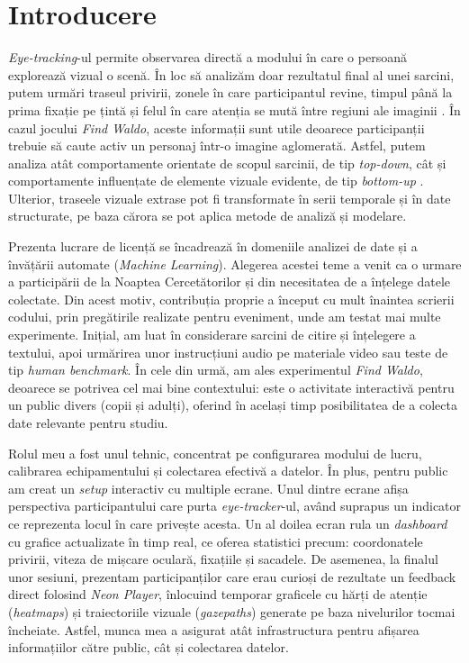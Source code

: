 \section{Introducere}

\emph{Eye-tracking}-ul permite observarea directă a modului în care o persoană explorează vizual o scenă. În loc să analizăm doar rezultatul final al unei sarcini, putem urmări traseul privirii, zonele în care participantul revine, timpul până la prima fixație pe țintă și felul în care atenția se mută între regiuni ale imaginii \cite{yarbus1967,just1980}. În cazul jocului \emph{Find Waldo}, aceste informații sunt utile deoarece participanții trebuie să caute activ un personaj într-o imagine aglomerată. Astfel, putem analiza atât comportamente orientate de scopul sarcinii, de tip \emph{top-down}, cât și comportamente influențate de elemente vizuale evidente, de tip \emph{bottom-up} \cite{itti1998,otero2016waldo,wolfe2020visual}. Ulterior, traseele vizuale extrase pot fi transformate în serii temporale și în date structurate, pe baza cărora se pot aplica metode de analiză și modelare.

Prezenta lucrare de licență se încadrează în domeniile analizei de date și a învățării automate (\emph{Machine Learning}). Alegerea acestei teme a venit ca o urmare a participării de la Noaptea Cercetătorilor și din necesitatea de a înțelege datele colectate. Din acest motiv, contribuția proprie a început cu mult înaintea scrierii codului, prin pregătirile realizate pentru eveniment, unde am testat mai multe experimente. Inițial, am luat în considerare sarcini de citire și înțelegere a textului, apoi urmărirea unor instrucțiuni audio pe materiale video sau teste de tip \emph{human benchmark}. În cele din urmă, am ales experimentul \emph{Find Waldo}, deoarece se potrivea cel mai bine contextului: este o activitate interactivă pentru un public divers (copii și adulți), oferind în același timp posibilitatea de a colecta date relevante pentru studiu. 

Rolul meu a fost unul tehnic, concentrat pe configurarea modului de lucru, calibrarea echipamentului și colectarea efectivă a datelor. În plus, pentru public am creat un \emph{setup} interactiv cu multiple ecrane. Unul dintre ecrane afișa perspectiva participantului care purta \emph{eye-tracker}-ul, având suprapus un indicator ce reprezenta locul în care privește acesta. Un al doilea ecran rula un \emph{dashboard} cu grafice actualizate în timp real, ce oferea statistici precum: coordonatele privirii, viteza de mișcare oculară, fixațiile și sacadele. De asemenea, la finalul unor sesiuni, prezentam participanților care erau curioși de rezultate un feedback direct folosind \emph{Neon Player}, înlocuind temporar graficele cu hărți de atenție (\emph{heatmaps}) și traiectoriile vizuale (\emph{gazepaths}) generate pe baza nivelurilor tocmai încheiate. Astfel, munca mea a asigurat atât infrastructura pentru afișarea informațiilor către public, cât și colectarea datelor. 

